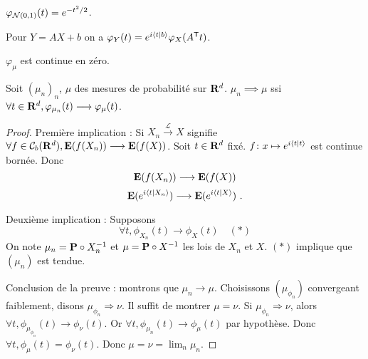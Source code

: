 	\begin{ex}
		$\varphi_{\mathcal{N}(0,1)}(t) = e^{-t^2/2}$.
	\end{ex}

	Pour $Y = AX + b$ on a $\varphi_Y(t) = e^{i \left\langle t \mid b \right\rangle} \varphi_X(A^\mathsf{T}t)$.

	\begin{pop}
		$\varphi_\mu$ est continue en zéro.
	\end{pop}

	\begin{thm}[de Lévy]
		Soit $(\mu_n)_n$, $\mu$ des mesures de probabilité sur $\mathbf{R}^d$.
		$\mu_n \implies \mu$ ssi $\forall t \in \mathbf{R}^d, \varphi_{\mu_n}(t) \longrightarrow \varphi_\mu(t)$.
	\end{thm}
	
	\begin{proof}
		Première implication :
		Si $X_n \overset{\mathcal{L}}{\longrightarrow} X$ signifie $\forall f \in \mathcal{C}_b(\mathbf{R}^d), \mathbf{E}(f(X_n)) \longrightarrow \mathbf{E}(f(X))$.
		Soit $t \in \mathbf{R}^d$ fixé.
		$f \colon x \mapsto e^{i\left\langle t \mid t \right\rangle}$ est continue bornée.
		Donc
		$$\mathbf{E}(f(X_n)) \longrightarrow \mathbf{E}(f(X))$$
		$$\mathbf{E}(e^{i \left\langle t \mid X_n \right\rangle}) \longrightarrow \mathbf{E}(e^{i \left\langle t \mid X \right\rangle})\ .$$
		
		Deuxième implication :
		Supposons
		$$\forall t, \phi_{X_n}(t) \longrightarrow \phi_X(t) \quad (*)$$
		On note $\mu_n = \mathbf{P} \circ X_n^{-1}$ et $\mu = \mathbf{P} \circ X^{-1}$ les lois de $X_n$ et $X$.
		$(*)$ implique que $(\mu_n)$ est tendue.
		
		Conclusion de la preuve : montrons que $\mu_n \longrightarrow \mu$.
		Choisissons $(\mu_{\phi_n})$ convergeant faiblement, disons $\mu_{\phi_n} \Longrightarrow \nu$.
		Il suffit de montrer $\mu = \nu$.
		Si $\mu_{\phi_n} \Longrightarrow \nu$, alors $\forall t, \phi_{\mu_{\phi_n}}(t) \longrightarrow \phi_{\nu}(t)$.
		Or $\forall t, \phi_{\mu_n}(t) \longrightarrow \phi_\mu(t)$ par hypothèse.
		Donc $\forall t, \phi_{\mu}(t) = \phi_\nu(t)$.
		Donc $\mu = \nu = \lim_n \mu_n$.
		

\end{proof}
